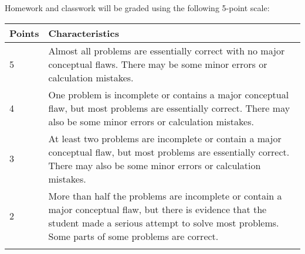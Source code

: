 \documentclass[11pt,]{article}
\begin{document}
Homework and classwork will be graded using the following 5-point scale:

\begin{longtable}[]{@{}ll@{}}
\toprule
\begin{minipage}[b]{0.08\columnwidth}\raggedright\strut
Points
\strut\end{minipage} &
\begin{minipage}[b]{0.86\columnwidth}\raggedright\strut
Characteristics
\strut\end{minipage}\tabularnewline
\midrule
\endhead
\begin{minipage}[t]{0.08\columnwidth}\raggedright\strut
5
\strut\end{minipage} &
\begin{minipage}[t]{0.86\columnwidth}\raggedright\strut
Almost all problems are essentially correct with no major conceptual
flaws. There may be some minor errors or calculation mistakes.
\strut\end{minipage}\tabularnewline
\begin{minipage}[t]{0.08\columnwidth}\raggedright\strut
4
\strut\end{minipage} &
\begin{minipage}[t]{0.86\columnwidth}\raggedright\strut
One problem is incomplete or contains a major conceptual flaw, but most
problems are essentially correct. There may also be some minor errors or
calculation mistakes.
\strut\end{minipage}\tabularnewline
\begin{minipage}[t]{0.08\columnwidth}\raggedright\strut
3
\strut\end{minipage} &
\begin{minipage}[t]{0.86\columnwidth}\raggedright\strut
At least two problems are incomplete or contain a major conceptual flaw,
but most problems are essentially correct. There may also be some minor
errors or calculation mistakes.
\strut\end{minipage}\tabularnewline
\begin{minipage}[t]{0.08\columnwidth}\raggedright\strut
2
\strut\end{minipage} &
\begin{minipage}[t]{0.86\columnwidth}\raggedright\strut
More than half the problems are incomplete or contain a major conceptual
flaw, but there is evidence that the student made a serious attempt to
solve most problems. Some parts of some problems are correct.
\strut\end{minipage}\tabularnewline
\begin{minipage}[t]{0.08\columnwidth}\raggedright\strut

\end{minipage}
\end{longtable}
\end{document}
